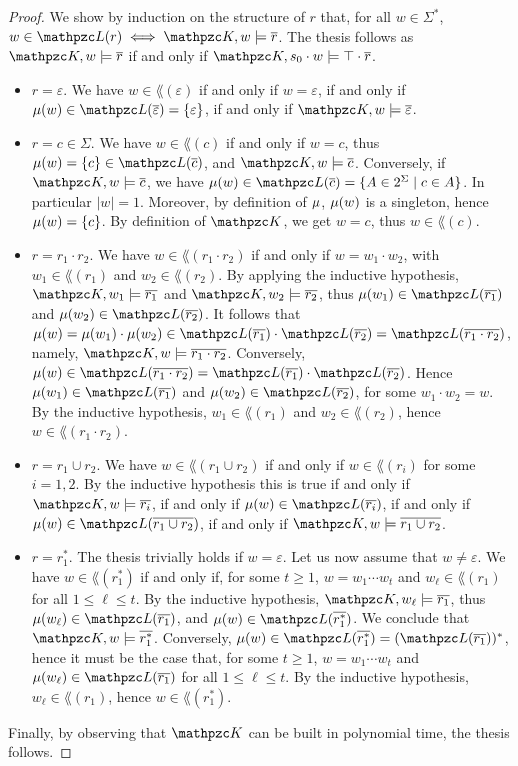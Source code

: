 \begin{proof}
    We show by induction on the structure of $r$ that, for all $w\in\Sigma^*$, $w \in\lang(r)\iff\Ku,w \models \overline{r}$.
The thesis follows as $\Ku,w \models \overline{r}$ if and only if $\Ku,\sinit\cdot w \models \top\cdot \overline{r}$.
%
\begin{itemize}
    \item $r=\varepsilon$. We have $w \in\lang(\varepsilon)$ if and only if $w=\varepsilon$, if and only if $\Lab(w)\in\lang(\overline{\varepsilon})=\{\varepsilon\}$, if and only if $\Ku,w\models \overline{\varepsilon}$.
%  
    \item $r=c\in\Sigma$. We have $w \in\lang(c)$ if and only if $w=c$, thus $\Lab(w)=\{c\}\in\lang(\overline{c})$, and $\Ku,w\models \overline{c}$. Conversely, if $\Ku,w\models \overline{c}$, we have $\Lab(w)\in\lang(\overline{c})=\{A\in 2^\Sigma\mid c\in A\}$. In particular $|w|=1$. Moreover, by definition of $\mu$, $\mu(w)$ is a singleton, hence $\mu(w)=\{c\}$. By definition of $\Ku$, we get $w=c$, thus $w \in\lang(c)$.
%
    \item $r=r_1\cdot r_2$. We have $w \in\lang(r_1\cdot r_2)$ if and only if $w=w_1\cdot w_2$, with $w_1 \in\lang(r_1)$ and $w_2 \in\lang(r_2)$. By applying the inductive hypothesis, $\Ku,w_1 \models \overline{r_1}$ and $\Ku,w_2 \models \overline{r_2}$, thus $\Lab(w_1)\in\lang(\overline{r_1})$ and $\Lab(w_2)\in\lang(\overline{r_2})$. It follows that $\Lab(w)=\Lab(w_1)\cdot\Lab(w_2)\in\lang(\overline{r_1})\cdot\lang(\overline{r_2})=\lang(\overline{r_1\cdot r_2})$, namely, $\Ku,w\models \overline{r_1\cdot r_2}$.
    Conversely, $\Lab(w)\in\lang(\overline{r_1\cdot r_2})=\lang(\overline{r_1})\cdot\lang(\overline{r_2})$. Hence $\Lab(w_1)\in\lang(\overline{r_1})$ and $\Lab(w_2)\in\lang(\overline{r_2})$, for some $w_1\cdot w_2=w$. By the inductive hypothesis, $w_1\in\lang(r_1)$ and $w_2\in\lang(r_2)$, hence $w \in\lang(r_1\cdot r_2)$.
%  
    \item $r=r_1\cup r_2$. We have $w \in\lang(r_1\cup r_2)$ if and only if $w \in\lang(r_i)$ for some $i=1,2$. By the inductive hypothesis this is true if and only if $\Ku,w \models \overline{r_i}$, if and only if $\Lab(w) \in\lang(\overline{r_i})$, if and only if $\Lab(w) \in\lang(\overline{r_1\cup r_2})$, if and only if $\Ku,w \models \overline{r_1\cup r_2}$.
%
    \item $r=r_1^*$. 
 The thesis trivially holds if $w=\varepsilon$. 
    Let us now assume that $w\neq\varepsilon$. We have  $w \in\lang(r_1^*)$ if and only if, for some $t\geq 1$, $w=w_1\cdots w_t$ and $w_\ell\in\lang(r_1)$ for all $1\leq \ell\leq t$. By the inductive hypothesis, $\Ku,w_\ell \models \overline{r_1}$, thus $\Lab(w_\ell)\in\lang(\overline{r_1})$, and $\Lab(w)\in\lang(\overline{r_1^*})$. We conclude that $\Ku,w \models \overline{r_1^*}$. Conversely, $\Lab(w)\in\lang(\overline{r_1^*})=(\lang(\overline{r_1}))^*$, hence it must be the case that, for some $t\geq 1$, $w=w_1\cdots w_t$ and $\Lab(w_\ell)\in\lang(\overline{r_1})$  for all $1\leq \ell\leq t$. By the inductive hypothesis, $w_\ell\in\lang(r_1)$, hence $w\in\lang(r_1^*)$.
\end{itemize}
Finally, by observing that $\Ku$ can be built in polynomial time, the thesis follows.
\end{proof}
